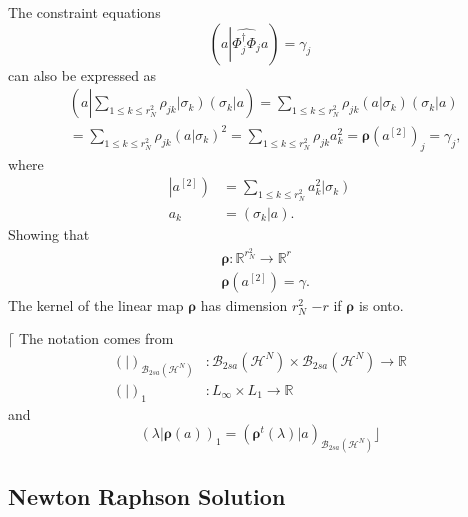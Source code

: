 \documentclass[aps,preprint]{revtex4}%
\begin{document}
The constraint equations
\begin{equation}
\left(  a\left\vert \widehat{\Phi_{j}^{\dagger}\Phi_{j}}\right.  a\right)
=\gamma_{j}%
\end{equation}
can also be expressed as
\begin{align}
&  \left(  a\left\vert \sum_{1\leq k\leq r_{N}^{2}}\rho_{jk}\left\vert
\sigma_{k}\right)  \left(  \sigma_{k}\right\vert \right.  a\right)
=\sum_{1\leq k\leq r_{N}^{2}}\rho_{jk}\left(  \left.  \overset{}{a}\right\vert
\sigma_{k}\right)  \left(  \left.  \overset{}{\sigma}_{k}\right\vert a\right)
\nonumber\\
&  =\sum_{1\leq k\leq r_{N}^{2}}\rho_{jk}\left(  \left.  \overset{}%
{a}\right\vert \sigma_{k}\right)  ^{2}=\sum_{1\leq k\leq r_{N}^{2}}\rho
_{jk}a_{k}^{2}=\mathbf{\rho}\left(  a^{\left[  2\right]  }\right)  _{j}%
=\gamma_{j},
\end{align}
where
\begin{align}
\left\vert a^{\left[  2\right]  }\right)   &  =\sum_{1\leq k\leq r_{N}^{2}%
}a_{k}^{2}\left\vert \sigma_{k}\right) \nonumber\\
a_{k}  &  =\left(  \left.  \overset{}{\sigma}_{k}\right\vert a\right)  .
\end{align}
Showing that
\begin{align}
&  \mathbf{\rho}:\mathbb{R}^{r_{N}^{2}}\rightarrow\mathbb{R}^{r}\nonumber\\
&  \mathbf{\rho}\left(  a^{\left[  2\right]  }\right)  =\gamma.
\end{align}
The kernel of the linear map $\mathbf{\rho}$ has dimension $r_{N}^{2}$ $-r$ if
$\mathbf{\rho}$ is onto.

$\lceil$ The notation comes from
\begin{align}
\left(  |\right)  _{\mathcal{B}_{2sa}\left(  \mathcal{H}^{N}\right)  }  &
:\mathcal{B}_{2sa}\left(  \mathcal{H}^{N}\right)  \times\mathcal{B}%
_{2sa}\left(  \mathcal{H}^{N}\right)  \rightarrow\mathbb{R}\nonumber\\
\left(  |\right)  _{1}  &  :L_{\infty}\times L_{1}\rightarrow\mathbb{R}%
\end{align}
and
\begin{equation}
\left(  \lambda|\mathbf{\rho}\left(  a\right)  \right)  _{1}=\left(
\mathbf{\rho}^{t}\left(  \lambda\right)  |a\right)  _{\mathcal{B}_{2sa}\left(
\mathcal{H}^{N}\right)  }\rfloor
\end{equation}


\subsection{Newton Raphson Solution}
\end{document}
